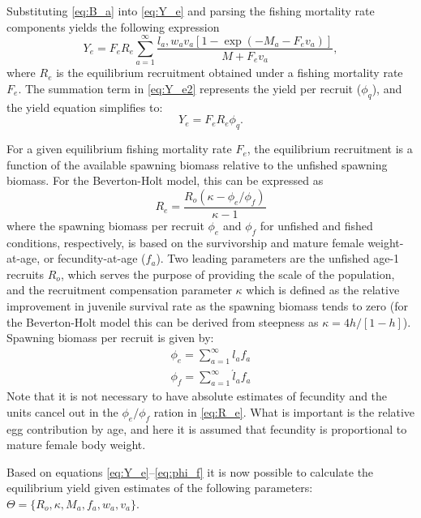 Substituting \eqref{eq:B_a} into  \eqref{eq:Y_e} and parsing the fishing mortality rate components yields the following expression
\begin{equation}\label{eq:Y_e2}
	Y_e = F_e R_e \sum_{a=1}^\infty \frac{l_a,w_a v_a [1-\exp(-M_a-F_e v_a)]}{M+F_e v_a},
\end{equation}
where $R_e$ is the equilibrium recruitment obtained under a fishing mortality rate $F_e$. The summation term in \eqref{eq:Y_e2} represents the yield per recruit ($\phi_q$), and the yield equation simplifies to:
\begin{equation}\label{eq:Y_e3}
	Y_e = F_e R_e \phi_q.
\end{equation}

For a given equilibrium fishing mortality rate $F_e$, the equilibrium recruitment is a function of the available spawning biomass relative to the unfished spawning biomass. For the Beverton-Holt model, this can be expressed as
\begin{equation}\label{eq:R_e}
	R_e = \frac{R_o (\kappa-\phi_e/\phi_f)}{\kappa -1} 
\end{equation}
where the spawning biomass per recruit $\phi_e$ and $\phi_f$ for unfished and fished conditions, respectively, is based on the survivorship and mature female weight-at-age,  or fecundity-at-age ($f_a$).  Two leading parameters are the unfished age-1 recruits $R_o$, which serves the purpose of providing the scale of the population, and the recruitment compensation parameter $\kappa$ which is defined as the relative improvement in juvenile survival rate as the spawning biomass tends to zero (for the Beverton-Holt model this can be derived from steepness as $\kappa= 4h/[1-h]$).  Spawning biomass per recruit is given by:
\begin{eqnarray}
	\phi_e = \sum_{a=1}^\infty l_a f_a\label{eq:phi_e}\\
	\phi_f = \sum_{a=1}^\infty \acute{l}_a f_a\label{eq:phi_f}
\end{eqnarray}
Note that it is not necessary to have absolute estimates of fecundity and the units cancel out in the $\phi_e/\phi_f$ ration in \eqref{eq:R_e}. What is important is the relative egg contribution by age, and here it is assumed that fecundity is proportional to mature female body weight.

Based on equations \ref{eq:Y_e}--\ref{eq:phi_f} it is now possible to calculate the equilibrium yield given estimates of the following parameters: $\Theta = \{R_o, \kappa, M_a, f_a, w_a, v_a\}$.

